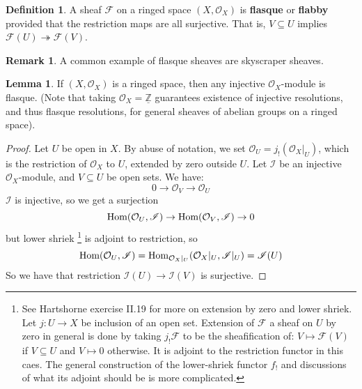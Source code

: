 \documentclass[10pt,reqno]{amsart}
\theoremstyle{definition}
\newtheorem{definition}[theorem]{Definition}
\newtheorem{lemma}[theorem]{Lemma}
\newtheorem{remark}[theorem]{Remark}
\theoremstyle{remark}
\numberwithin{equation}{section}
\numberwithin{theorem}{section}
\newcommand{\Z}{{\mathbb Z}}
\newcommand{\OO}{{\mathcal O}}
\newcommand{\Hom}{\textup{Hom}}
\newcommand{\FF}{{\mathscr F}}
\newcommand{\II}{{\mathscr I}}
\begin{document}
\begin{definition} A sheaf $\FF$ on a ringed space $(X,\OO_X)$ is \textbf{flasque} or \textbf{flabby} provided that the restriction maps are all surjective. That is, $V \subseteq U$ implies $\FF(U) \twoheadrightarrow \FF(V)$. 
\end{definition}

\begin{remark}A common example of flasque sheaves are skyscraper sheaves.
\end{remark}

\begin{lemma}\label{lemma:injective-implies-flasque} If $(X,\OO_X)$ is a ringed space, then any injective $\OO_X$-module is flasque. (Note that taking $\OO_X = \underline{\Z}$ guarantees existence of injective resolutions, and thus flasque resolutions, for general sheaves of abelian groups on a ringed space).
\end{lemma}
\begin{proof}
Let $U$ be open in $X$. By abuse of notation, we set $\OO_U = j_!(\OO_X|_U)$, which is the restriction of $\OO_X$ to $U$, extended by zero outside $U$. Let $\II$ be an injective $\OO_X$-module, and $V \subseteq U$ be open sets. We have:
\[0 \to \OO_V \to \OO_U\]
$\II$ is injective, so we get a surjection 
\[\Hom(\OO_U, \II) \to \Hom(\OO_V,\II) \to 0\]
but lower shriek \footnote{See Hartshorne exercise II.19 for more on extension by zero and lower shriek. Let $j: U \to X$ be inclusion of an open set. Extension of $\FF$ a sheaf on $U$ by zero in general is done by taking $j_!\FF$ to be the sheafification of: $V \mapsto \FF(V)$ if $V \subseteq U$ and $V \mapsto 0$ otherwise. It is adjoint to the restriction functor in this caes. The general construction of the lower-shriek functor $f_!$ and discussions of what its adjoint should be is more complicated.} is adjoint to restriction, so
\[\Hom(\OO_U,\II) = \Hom_{\OO_X|_{U}}(\OO_X|_{U}, \II|_U) = \II(U)\]
So we have that restriction $\II(U) \to \II(V)$ is surjective.
\end{proof}
\end{document}
